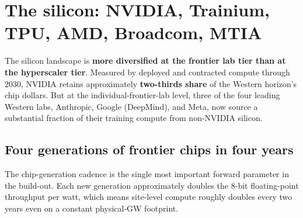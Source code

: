 \documentclass[11pt,a4paper]{article}
\begin{document}
\section{The silicon: NVIDIA, Trainium, TPU, AMD, Broadcom, MTIA}
\label{sec:silicon}

The silicon landscape is \textbf{more diversified at the frontier lab tier than at the hyperscaler tier}. Measured by deployed and contracted compute through 2030, NVIDIA retains approximately \textbf{two-thirds share} of the Western horizon's chip dollars. But at the individual-frontier-lab level, three of the four leading Western labs, Anthropic, Google (DeepMind), and Meta, now source a substantial fraction of their training compute from non-NVIDIA silicon.

\subsection{Four generations of frontier chips in four years}

The chip-generation cadence is the single most important forward parameter in the build-out. Each new generation approximately doubles the 8-bit floating-point throughput per watt, which means site-level compute roughly doubles every two years even on a constant physical-GW footprint.
\end{document}
